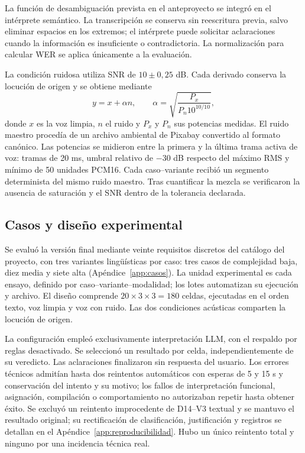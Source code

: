 \documentclass[a4paper,fleqn]{cas-dc}
\begin{document}
La función de desambiguación prevista en el anteproyecto se integró en el intérprete semántico. La transcripción se conserva sin reescritura previa, salvo eliminar espacios en los extremos; el intérprete puede solicitar aclaraciones cuando la información es insuficiente o contradictoria. La normalización para calcular WER se aplica únicamente a la evaluación.


La condición ruidosa utiliza SNR de $10\pm0{,}25$ dB. Cada derivado conserva la locución de origen y se obtiene mediante
\begin{equation}
y=x+\alpha n,\qquad \alpha=\sqrt{\frac{P_x}{P_n10^{10/10}}},
\end{equation}
donde $x$ es la voz limpia, $n$ el ruido y $P_x$ y $P_n$ sus potencias medidas. El ruido maestro procedía de un archivo ambiental de Pixabay convertido al formato canónico. Las potencias se midieron entre la primera y la última trama activa de voz: tramas de 20 ms, umbral relativo de $-30$ dB respecto del máximo RMS y mínimo de 50 unidades PCM16. Cada caso--variante recibió un segmento determinista del mismo ruido maestro. Tras cuantificar la mezcla se verificaron la ausencia de saturación y el SNR dentro de la tolerancia declarada.

\subsection{Casos y diseño experimental}
\label{sec:casos}
\label{sec:condiciones}
Se evaluó la versión final mediante veinte requisitos discretos del catálogo del proyecto, con tres variantes lingüísticas por caso: tres casos de complejidad baja, diez media y siete alta (Apéndice~\ref{app:casos}). La unidad experimental es cada ensayo, definido por caso--variante--modalidad; los lotes automatizan su ejecución y archivo. El diseño comprende $20\times3\times3=180$ celdas, ejecutadas en el orden texto, voz limpia y voz con ruido. Las dos condiciones acústicas comparten la locución de origen.

La configuración empleó exclusivamente interpretación LLM, con el respaldo por reglas desactivado. Se seleccionó un resultado por celda, independientemente de su veredicto. Las aclaraciones finalizaron sin respuesta del usuario. Los errores técnicos admitían hasta dos reintentos automáticos con esperas de 5 y 15 s y conservación del intento y su motivo; los fallos de interpretación funcional, asignación, compilación o comportamiento no autorizaban repetir hasta obtener éxito. Se excluyó un reintento improcedente de D14--V3 textual y se mantuvo el resultado original; su rectificación de clasificación, justificación y registros se detallan en el Apéndice~\ref{app:reproducibilidad}. Hubo un único reintento total y ninguno por una incidencia técnica real.
\end{document}
